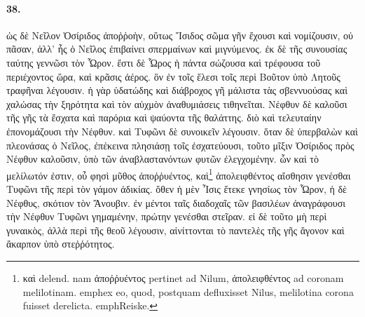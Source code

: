 \documentclass[a4paper, 11pt, oneside, polutonikogreek, german]{article}
\begin{document}
\paragraph{38.}
ὡς δὲ Νεῖλον Ὀσίριδος ἀποῤῥοὴν, οὕτως Ἴσιδος σῶμα γῆν ἔχουσι καὶ νομίζουσιν, οὐ πᾶσαν, ἀλλ' ἧς ὁ Νεῖλος ἐπιβαίνει σπερμαίνων καὶ μιγνύμενος. ἐκ δὲ τῆς συνουσίας ταύτης γεννῶσι τὸν Ὧρον. ἔστι δὲ Ὧρος ἡ πάντα σώζουσα καὶ τρέφουσα τοῦ περιέχοντος ὥρα, καὶ κρᾶσις ἀέρος. ὃν ἐν τοῖς ἕλεσι τοῖς περὶ Βοῦτον ὑπὸ Λητοῦς τραφῆναι λέγουσιν. ἡ γὰρ ὑδατώδης καὶ διάβροχος γῆ μάλιστα τὰς σβεννυούσας καὶ χαλώσας τὴν ξηρότητα καὶ τὸν αὐχμὸν ἀναθυμιάσεις τιθηνεῖται. Νέφθυν δὲ καλοῦσι τῆς γῆς τὰ ἔσχατα καὶ παρόρια καὶ ψαύοντα τῆς θαλάττης. διὸ καὶ τελευταίην ἐπονομάζουσι τὴν Νέφθυν. καὶ Τυφῶνι δὲ συνοικεῖν λέγουσιν. ὅταν δὲ ὑπερβαλὼν καὶ πλεονάσας ὁ Νεῖλος, ἐπέκεινα πλησιάσῃ τοῖς ἐσχατεύουσι, τοῦτο μῖξιν Ὀσίριδος πρὸς Νέφθυν καλοῦσιν, ὑπὸ τῶν ἀναβλαστανόντων φυτῶν ἐλεγχομένην. ὧν καὶ τὸ μελίλωτόν ἐστιν, οὗ φησὶ μῦθος ἀποῤῥυέντος, καὶ\footnote{καὶ delend. nam ἀποῤῥυέντος pertinet ad Nilum, ἀπολειφθέντος ad coronam melilotinam. emph{ex eo, quod, postquam defluxisset Nilus, melilotina corona fuisset derelicta.} emph{Reiske.}} ἀπολειφθέντος αἴσθησιν γενέσθαι Τυφῶνι τῆς περὶ τὸν γάμον ἀδικίας. ὅθεν ἡ μὲν Ἶσις ἔτεκε γνησίως τὸν Ὧρον, ἡ δὲ Νέφθυς, σκότιον τὸν Ἄνουβιν. ἐν μέντοι ταῖς διαδοχαῖς τῶν βασιλέων ἀναγράφουσι τὴν Νέφθυν Τυφῶνι γημαμένην, πρώτην γενέσθαι στεῖραν. εἰ δὲ τοῦτο μὴ περὶ γυναικὸς, ἀλλὰ περὶ τῆς θεοῦ λέγουσιν, αἰνίττονται τὸ παντελὲς τῆς γῆς ἄγονον καὶ ἄκαρπον ὑπὸ στεῤῥότητος.
\end{document}
